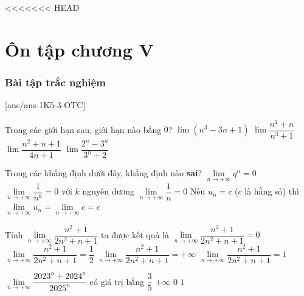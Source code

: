 <<<<<<< HEAD
\section{Ôn tập chương V}
\subsubsection{Bài tập trắc nghiệm}
[ans/ans-1K5-3-OTC]
\begin{ex}%
	Trong các giới hạn sau, giới hạn nào bằng $ 0 $?
	\choice
	{$ \lim(n^3-3n+1) $}
	{\True $ \lim\dfrac{n^2+n}{n^3+1} $}
	{$ \lim\dfrac{n^2+n+1}{4n+1} $}
	{$ \lim\dfrac{2^n-3^n}{3^n+2} $}
\end{ex}
\begin{ex}%
	Trong các khẳng định dưới đây, khẳng định nào \textbf{sai}?
	\choice
	{\True $\lim\limits_{n \to +\infty} q^n=0$}
	{$\lim\limits_{n \to +\infty} \dfrac{1}{n^k}=0$ với $k$ nguyên dương}
	{$\lim\limits_{n \to +\infty} \dfrac{1}{n}=0$}
	{Nếu $u_n=c$ ($c$ là hằng số) thì $\lim\limits_{n \to +\infty} u_n=\lim \limits_{n \to +\infty}c=c$}
\end{ex}

\begin{ex}%
	Tính $\lim \limits_{n \to +\infty}\dfrac{n^2+1}{2n^2+n+1}$ ta được kết quả là
	\choice
	{$\lim \limits_{n \to +\infty}\dfrac{n^2+1}{2n^2+n+1}=0$}
	{\True $\lim \limits_{n \to +\infty}\dfrac{n^2+1}{2n^2+n+1}=\dfrac{1}{2}$}
	{$\lim \limits_{n \to +\infty}\dfrac{n^2+1}{2n^2+n+1}=+\infty $}
	{$\lim \limits_{n \to +\infty}\dfrac{n^2+1}{2n^2+n+1}=1$}
\end{ex}

\begin{ex}%
	$\lim \limits_{n \to +\infty}\dfrac{2023^n+2024^n}{2025^n}$ có giá trị bằng
	\choice
	{$\dfrac{3}{5}$}
	{$+\infty$}
	{\True $0$}
	{$1$}
\end{ex}

